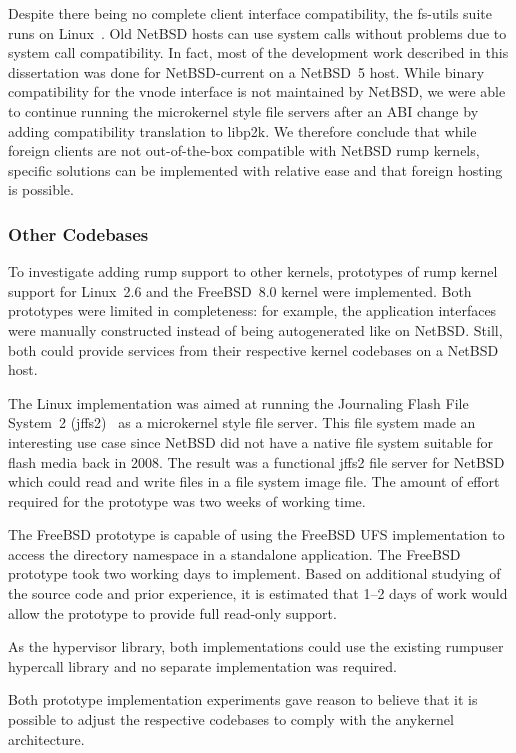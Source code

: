 Despite there being no complete client interface compatibility,
the fs-utils suite runs on Linux~\cite{ysmal:fs-utils}.  Old NetBSD
hosts can use system calls without problems due to system call
compatibility.  In fact, most of the development work described in
this dissertation was done for NetBSD-current on a NetBSD~5 host.
While binary compatibility for the vnode interface is not maintained
by NetBSD,
we were able to continue running the microkernel style file servers
after an ABI change by adding compatibility translation to libp2k.
We therefore conclude that while foreign clients are not out-of-the-box
compatible with NetBSD rump kernels, specific solutions can be
implemented with relative ease and that foreign hosting is possible.

\subsubsection{Other Codebases}
\label{sect:otherkern}

To investigate adding rump support to other kernels, prototypes
of rump kernel support for Linux~2.6 and the FreeBSD~8.0 kernel
were implemented.  Both prototypes were limited in
completeness: for example, the application interfaces were manually constructed
instead
of being autogenerated like on NetBSD.  Still, both could provide
services from their respective kernel codebases on a NetBSD host.

The Linux implementation was aimed at running the Journaling Flash
File System~2 (jffs2)~\cite{woodhouse:jffs2} as a microkernel
style file server.  This file system made an interesting use case since
NetBSD did not have a native file system suitable for flash media back
in 2008.  The result was a functional jffs2 file server for NetBSD which
could read and write files in a file system image file.  The amount of
effort required for the prototype was two weeks of working time.

The FreeBSD prototype is capable of using the FreeBSD UFS
implementation to access the directory namespace in a standalone
application.  The FreeBSD prototype took two working days to
implement.  Based on additional studying of the source code and prior
experience, it is estimated that 1--2 days of work would allow the
prototype to provide full read-only support.

As the hypervisor library, both implementations could use the
existing rumpuser hypercall library and no separate implementation
was required.

Both prototype implementation experiments gave reason to believe
that it is possible to adjust the respective codebases to comply
with the anykernel architecture.

